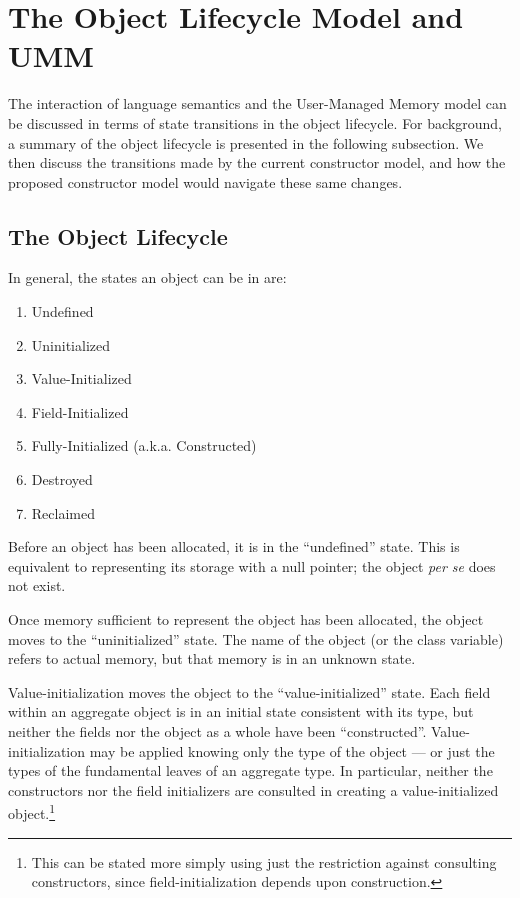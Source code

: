 \section{The Object Lifecycle Model and UMM}

The interaction of language semantics and the User-Managed Memory model can be discussed
in terms of state transitions in the object lifecycle.  For background, a summary of the
object lifecycle is presented in the following subsection.  We then discuss the
transitions made by the current constructor model, and how the proposed constructor model
would navigate these same changes.


\subsection{The Object Lifecycle}

In general, the states an object can be in are:
\begin{enumerate}
\item Undefined
\item Uninitialized
\item Value-Initialized
\item Field-Initialized
\item Fully-Initialized (a.k.a. Constructed)
\item Destroyed
\item Reclaimed
\end{enumerate}

Before an object has been allocated, it is in the ``undefined'' state.  This is
equivalent to representing its storage with a null pointer; the object {\it per
se} does not exist.

Once memory sufficient to represent the object has been allocated, the object
moves to the ``uninitialized'' state.  The name of the object (or the class
variable) refers to actual memory, but that memory is in an unknown state.

Value-initialization moves the object to the ``value-initialized'' state.  Each
field within an aggregate object is in an initial state consistent with its type,
but neither the fields nor the object as a whole have been ``constructed''.
Value-initialization may be applied knowing only the type of the object --- or
just the types of the fundamental leaves of an aggregate type.  In particular,
neither the constructors nor the field initializers are consulted in creating a
value-initialized object.\footnote{This can be stated more simply using just the
  restriction against consulting constructors, since field-initialization
  depends upon construction.}

